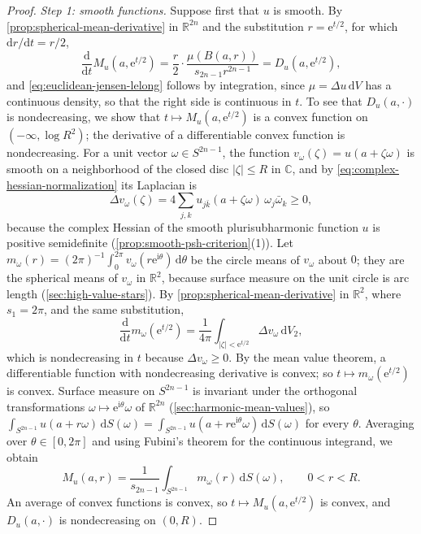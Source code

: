 \begin{proof}
\emph{Step 1: smooth functions.} Suppose first that $u$ is smooth. By \cref{prop:spherical-mean-derivative} in $\mathbb R^{2n}$ and the substitution $r=\mathrm e^{t/2}$, for which $\mathrm dr/\mathrm dt=r/2$,
\[
 \frac{\mathrm d}{\mathrm dt}M_u(a,\mathrm e^{t/2})
 =\frac r2\cdot\frac{\mu(B(a,r))}{s_{2n-1}r^{2n-1}}
 =D_u(a,\mathrm e^{t/2}),
\]
and \eqref{eq:euclidean-jensen-lelong} follows by integration, since $\mu=\Delta u\,\mathrm dV$ has a continuous density, so that the right side is continuous in $t$. To see that $D_u(a,\cdot)$ is nondecreasing, we show that $t\mapsto M_u(a,\mathrm e^{t/2})$ is a convex function on $(-\infty,\log R^2)$; the derivative of a differentiable convex function is nondecreasing. For a unit vector $\omega\in S^{2n-1}$, the function $v_\omega(\zeta)=u(a+\zeta\omega)$ is smooth on a neighborhood of the closed disc $|\zeta|\leq R$ in $\mathbb C$, and by \eqref{eq:complex-hessian-normalization} its Laplacian is
\[
 \Delta v_\omega(\zeta)=4\sum_{j,k}u_{j\bar k}(a+\zeta\omega)\,\omega_j\bar\omega_k\geq0,
\]
because the complex Hessian of the smooth plurisubharmonic function $u$ is positive semidefinite (\cref{prop:smooth-psh-criterion}(1)). Let $m_\omega(r)=(2\pi)^{-1}\int_0^{2\pi}v_\omega(r\mathrm e^{\mathrm i\theta})\,\mathrm d\theta$ be the circle means of $v_\omega$ about $0$; they are the spherical means of $v_\omega$ in $\mathbb R^2$, because surface measure on the unit circle is arc length (\cref{sec:high-value-stars}). By \cref{prop:spherical-mean-derivative} in $\mathbb R^2$, where $s_1=2\pi$, and the same substitution,
\[
 \frac{\mathrm d}{\mathrm dt}m_\omega(\mathrm e^{t/2})=\frac1{4\pi}\int_{|\zeta|<\mathrm e^{t/2}}\Delta v_\omega\,\mathrm dV_2,
\]
which is nondecreasing in $t$ because $\Delta v_\omega\geq0$. By the mean value theorem, a differentiable function with nondecreasing derivative is convex; so $t\mapsto m_\omega(\mathrm e^{t/2})$ is convex. Surface measure on $S^{2n-1}$ is invariant under the orthogonal transformations $\omega\mapsto\mathrm e^{\mathrm i\theta}\omega$ of $\mathbb R^{2n}$ (\cref{sec:harmonic-mean-values}), so $\int_{S^{2n-1}}u(a+r\omega)\,\mathrm dS(\omega)=\int_{S^{2n-1}}u(a+r\mathrm e^{\mathrm i\theta}\omega)\,\mathrm dS(\omega)$ for every $\theta$. Averaging over $\theta\in[0,2\pi]$ and using Fubini's theorem for the continuous integrand, we obtain
\[
 M_u(a,r)=\frac1{s_{2n-1}}\int_{S^{2n-1}}m_\omega(r)\,\mathrm dS(\omega),\qquad 0<r<R.
\]
An average of convex functions is convex, so $t\mapsto M_u(a,\mathrm e^{t/2})$ is convex, and $D_u(a,\cdot)$ is nondecreasing on $(0,R)$.


\end{proof}
